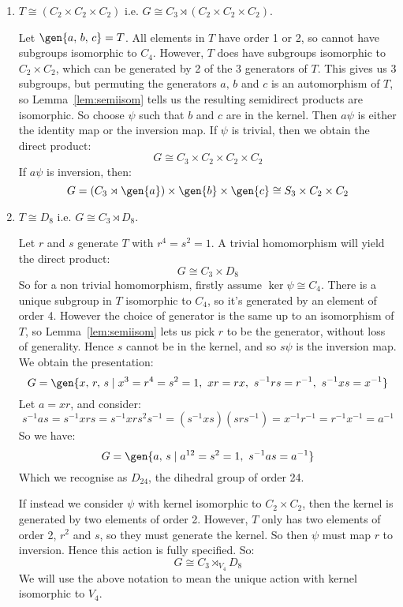 \begin{enumerate}
    \item \(T \cong (C_2 \times C_2 \times C_2)\) i.e. \(G \cong C_3 \rtimes (C_2 \times C_2 \times C_2)\).

        Let \(\gen{a,\,b,\,c} = T\).
        All elements in \(T\) have order 1 or 2, so cannot have subgroups isomorphic to \(C_4\).
        However, \(T\) does have subgroups isomorphic to \(C_2 \times C_2\), which can be generated by 2 of the 3
        generators of \(T\).
        This gives us 3 subgroups, but permuting the generators \(a,\,b\) and \(c\) is an automorphism of \(T\), so
        Lemma~\ref{lem:semiisom} tells us the resulting semidirect products are isomorphic.
        So choose \(\psi\) such that \(b\) and \(c\) are in the kernel.
        Then \(a\psi\) is either the identity map or the inversion map.
        If \(\psi\) is trivial, then we obtain the direct product:
        \[G \cong C_3 \times C_2 \times C_2 \times C_2\]
        If \(a\psi\) is inversion, then:
        \[G = (C_3 \rtimes \gen{a}) \times \gen{b} \times \gen{c} \cong S_3 \times C_2 \times C_2\]


    \item \(T \cong D_8\) i.e. \(G \cong C_3 \rtimes D_8\).

        Let \(r\) and \(s\) generate \(T\) with \(r^4 = s^2 = 1\).
        A trivial homomorphism will yield the direct product:
        \[G \cong C_3 \times D_8\]
        So for a non trivial homomorphism, firstly assume \(\ker\psi \cong C_4\).
        There is a unique subgroup in \(T\) isomorphic to \(C_4\), so it's generated by an element of order 4.
        However the choice of generator is the same up to an isomorphism of \(T\), so Lemma~\ref{lem:semiisom} lets us
        pick \(r\) to be the generator, without loss of generality.
        Hence \(s\) cannot be in the kernel, and so \(s\psi\) is the inversion map.
        We obtain the presentation:
        \[G = \gen{x,\,r,\,s \mid x^3 = r^4 = s^2 = 1,\ xr = rx,\ s^{-1}rs = r^{-1},\ s^{-1}xs = x^{-1}}\]
        Let \(a = xr\), and consider:
        \[s^{-1}as = s^{-1}xrs = s^{-1}xrs^2 s^{-1} = (s^{-1}xs)(srs^{-1}) = x^{-1}r^{-1} = r^{-1}x^{-1} = a^{-1}\]
        So we have:
        \[G = \gen{a,\,s \mid a^{12} = s^2 = 1,\ s^{-1}as = a^{-1}}\]
        Which we recognise as \(D_{24}\), the dihedral group of order 24.

        If instead we consider \(\psi\) with kernel isomorphic to \(C_2 \times C_2\), then the kernel is generated by
        two elements of order 2.
        However, \(T\) only has two elements of order 2, \(r^2\) and \(s\), so they must generate the kernel.
        So then \(\psi\) must map \(r\) to inversion.
        Hence this action is fully specified.
        So:
        \[G \cong C_3 \rtimes_{V_4} D_8\]
        We will use the above notation to mean the unique action with kernel isomorphic to \(V_4\).


\end{enumerate}

